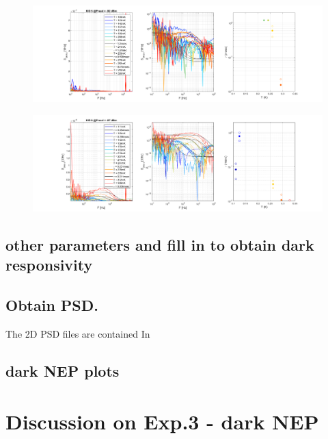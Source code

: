 \begin{figure}[ht]
	\centering
	\includegraphics[width=\linewidth]{../Data_Analysis_scripts_ADR/CrossPSD2D/crossPSD_Popt images/KID5P_92_crossPSD_Tdep.png}
	\caption{}
	\label{fig:}
\end{figure}
\begin{figure}[ht]
	\centering
	\includegraphics[width=\linewidth]{../Data_Analysis_scripts_ADR/CrossPSD2D/crossPSD_Popt images/KID6P_87_crossPSD_Tdep.png}
	\caption{}
	\label{fig:}
\end{figure}

\FloatBarrier

\subsection*{other parameters and fill in to obtain dark responsivity}

\subsection*{Obtain PSD.}

The 2D PSD files are contained In







\subsection*{dark NEP plots}


\section{Discussion on Exp.3 - dark NEP} 



